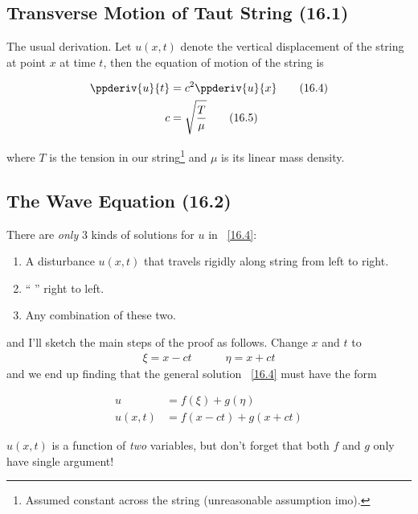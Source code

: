 \documentclass[10pt, twocolumn]{article}
\DeclareRobustCommand{\mybox}[2][gray!20]{%
	\begin{tcolorbox}[   %
		breakable,
		left=0pt,
		right=0pt,
		top=-13pt,
		bottom=0pt,
		colback=#1,
		colframe=#1,
		width=0.45\dimexpr\textwidth\relax,
		enlarge left by=0mm,
		boxsep=1pt,
		arc=0pt,outer arc=0pt,
		]
		#2
	\end{tcolorbox}
}
\newcommand\graybox[1]{ \mybox[gray!20]{\begin{align}#1\end{align}} }
\newcommand{\myspace}{\vspace{3\bigskipamount}}
\newcommand\p{\Needspace{10\baselineskip} \noindent}
\newcommand\tlab[1]{\tag{#1}\label{#1}}
\begin{document}
\subsection{Transverse Motion of Taut String (16.1)}

\p {} The usual derivation. Let $u(x,t)$ denote the vertical displacement of the string at point $x$ at time $t$, then the equation of motion of the string is
\graybox{
	\ppderiv{u}{t} &= c^2 \ppderiv{u}{x} \tlab{16.4}\\
	c &= \sqrt{\frac{T}{\mu}}\tlab{16.5}
	}
\p where $T$ is the tension in our string\footnote{Assumed constant across the string (unreasonable assumption imo).} and $\mu$ is its linear mass density. 

\myspace
\subsection{The Wave Equation (16.2)}

\p There are \textit{only} 3 kinds of solutions for $u$ in ~\ref{16.4}:
\begin{enumerate}
	\item A disturbance $u(x,t)$ that travels rigidly along string from left to right.
	\item `` \textellipsis\textellipsis '' right to left.
	\item Any combination of these two.
\end{enumerate}
and I'll sketch the main steps of the proof as follows. Change $x$ and $t$ to 
\begin{align}
	\xi = x - ct \qquad\quad \eta= x+ ct \tlab{16.6}
\end{align}
and we end up finding that the general solution ~\ref{16.4} must have the form
\graybox{
	u &= f(\xi) + g(\eta) \tlab{16.9} \\
	u(x, t) &= f(x - ct) + g(x+ct) \tlab{16.10}}
\p {} $u(x, t)$ is a function of \textit{two} variables, but don't forget that both $f$ and $g$ only have single argument!
\end{document}
